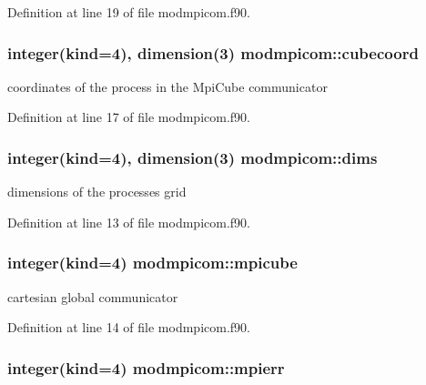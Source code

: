 Definition at line 19 of file modmpicom.\-f90.

\hypertarget{classmodmpicom_a533718abb8ce3f03b430dfbf9f821069}{
\subsubsection[{cubecoord}]{\setlength{\rightskip}{0pt plus 5cm}integer(kind=4), dimension(3) modmpicom\-::cubecoord}}\label{classmodmpicom_a533718abb8ce3f03b430dfbf9f821069}


coordinates of the process in the Mpi\-Cube communicator 



Definition at line 17 of file modmpicom.\-f90.

\hypertarget{classmodmpicom_a8762b65024b222a0c5bfab4f8af21d7d}{
\subsubsection[{dims}]{\setlength{\rightskip}{0pt plus 5cm}integer(kind=4), dimension(3) modmpicom\-::dims}}\label{classmodmpicom_a8762b65024b222a0c5bfab4f8af21d7d}


dimensions of the processes grid 



Definition at line 13 of file modmpicom.\-f90.

\hypertarget{classmodmpicom_a85f71373d318b169e73b6a0221dc62f1}{
\subsubsection[{mpicube}]{\setlength{\rightskip}{0pt plus 5cm}integer(kind=4) modmpicom\-::mpicube}}\label{classmodmpicom_a85f71373d318b169e73b6a0221dc62f1}


cartesian global communicator 



Definition at line 14 of file modmpicom.\-f90.

\hypertarget{classmodmpicom_a500c48035640d6e5b49b1b694372bcd3}{
\subsubsection[{mpierr}]{\setlength{\rightskip}{0pt plus 5cm}integer(kind=4) modmpicom\-::mpierr}}\label{classmodmpicom_a500c48035640d6e5b49b1b694372bcd3}


